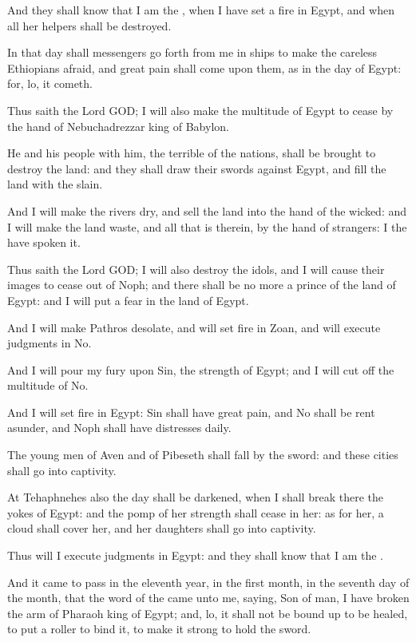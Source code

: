 \verse And they shall know that I am the \LORD, when I have set a fire in Egypt, and when all her helpers shall be destroyed.

\verse In that day shall messengers go forth from me in ships to make the careless Ethiopians afraid, and great pain shall come upon them, as in the day of Egypt: for, lo, it cometh.

\verse Thus saith the Lord GOD; I will also make the multitude of Egypt to cease by the hand of Nebuchadrezzar king of Babylon.

\verse He and his people with him, the terrible of the nations, shall be brought to destroy the land: and they shall draw their swords against Egypt, and fill the land with the slain.

\verse And I will make the rivers dry, and sell the land into the hand of the wicked: and I will make the land waste, and all that is therein, by the hand of strangers: I the \LORD have spoken it.

\verse Thus saith the Lord GOD; I will also destroy the idols, and I will cause their images to cease out of Noph; and there shall be no more a prince of the land of Egypt: and I will put a fear in the land of Egypt.

\verse And I will make Pathros desolate, and will set fire in Zoan, and will execute judgments in No.

\verse And I will pour my fury upon Sin, the strength of Egypt; and I will cut off the multitude of No.

\verse And I will set fire in Egypt: Sin shall have great pain, and No shall be rent asunder, and Noph shall have distresses daily.

\verse The young men of Aven and of Pibeseth shall fall by the sword: and these cities shall go into captivity.

\verse At Tehaphnehes also the day shall be darkened, when I shall break there the yokes of Egypt: and the pomp of her strength shall cease in her: as for her, a cloud shall cover her, and her daughters shall go into captivity.

\verse Thus will I execute judgments in Egypt: and they shall know that I am the \LORD.

\verse And it came to pass in the eleventh year, in the first month, in the seventh day of the month, that the word of the \LORD came unto me, saying, \verse Son of man, I have broken the arm of Pharaoh king of Egypt; and, lo, it shall not be bound up to be healed, to put a roller to bind it, to make it strong to hold the sword.


